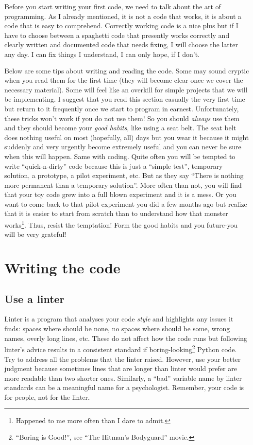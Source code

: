 \documentclass[
]{book}
\begin{document}
Before you start writing your first code, we need to talk about the art of programming. As I already mentioned, it is not a code that works, it is about a code that is easy to comprehend. Correctly working code is a nice plus but if I have to choose between a spaghetti code that presently works correctly and clearly written and documented code that needs fixing, I will choose the latter any day. I can fix things I understand, I can only hope, if I don't.

Below are some tips about writing and reading the code. Some may sound cryptic when you read them for the first time (they will become clear once we cover the necessary material). Some will feel like an overkill for simple projects that we will be implementing. I suggest that you read this section casually the very first time but return to it frequently once we start to program in earnest. Unfortunately, these tricks won't work if you do not use them! So you should \emph{always} use them and they should become your \emph{good habits}, like using a seat belt. The seat belt does nothing useful on most (hopefully, all) days but you wear it because it might suddenly and very urgently become extremely useful and you can never be sure when this will happen. Same with coding. Quite often you will be tempted to write ``quick-n-dirty'' code because this is just a ``simple test'', temporary solution, a prototype, a pilot experiment, etc. But as they say ``There is nothing more permanent than a temporary solution''. More often than not, you will find that your toy code grew into a full blown experiment and it is a mess. Or you want to come back to that pilot experiment you did a few months ago but realize that it is easier to start from scratch than to understand how that monster works\footnote{Happened to me more often than I dare to admit.}. Thus, resist the temptation! Form the good habits and you future-you will be very grateful!

\hypertarget{writing-tips}{%
\section{Writing the code}\label{writing-tips}}

\hypertarget{use-a-linter}{%
\subsection{Use a linter}\label{use-a-linter}}

Linter is a program that analyses your code \emph{style} and highlights any issues it finds: spaces where should be none, no spaces where should be some, wrong names, overly long lines, etc. These do not affect how the code runs but following linter's advice results in a consistent standard if boring-looking\footnote{``Boring is Good!'', see ``The Hitman's Bodyguard'' movie.} Python code. Try to address all the problems that the linter raised. However, use your better judgment because sometimes lines that are longer than linter would prefer are more readable than two shorter ones. Similarly, a ``bad'' variable name by linter standards can be a meaningful name for a psychologist. Remember, your code is for people, not for the linter.
\end{document}
